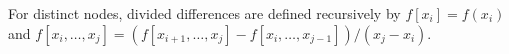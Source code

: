 
For distinct nodes, divided differences are defined recursively by $f[x_i]=f(x_i)$ and $f[x_i,\ldots,x_j]=(f[x_{i+1},\ldots,x_j]-f[x_i,\ldots,x_{j-1}])/(x_j-x_i)$.

